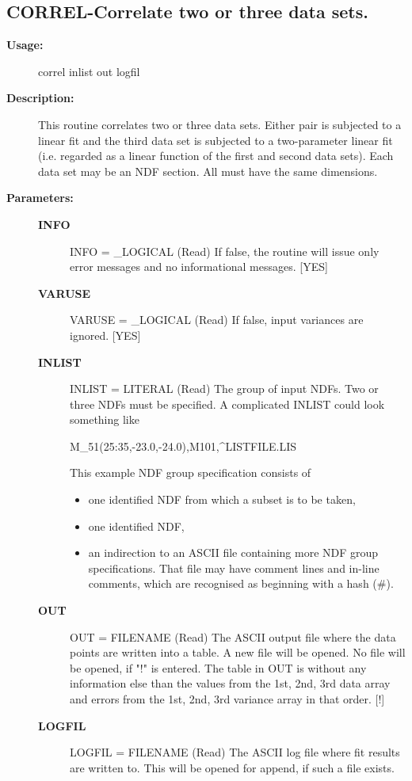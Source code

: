 \subsection{CORREL-\label{CORREL}Correlate two or three data sets.}
\begin{description}

\item [\textbf{Usage:}]

   correl inlist out logfil


\item [\textbf{Description:}]

   This routine correlates two or three data sets. Either pair is
   subjected to a linear fit and the third data set is subjected to a
   two-parameter linear fit (i.e. regarded as a linear function of
   the first and second data sets). Each data set may be an NDF
   section. All must have the same dimensions.

\item [\textbf{Parameters:}]
\begin{description}
\item [\textbf{INFO}]
INFO = \_LOGICAL (Read)
   If false, the routine will issue only error messages and no
   informational messages. [YES]
\item [\textbf{VARUSE}]
VARUSE = \_LOGICAL (Read)
   If false, input variances are ignored. [YES]
\item [\textbf{INLIST}]
INLIST = LITERAL (Read)
   The group of input NDFs. Two or three NDFs must be specified.
   A complicated INLIST could look something like
\begin{terminalv}
   M_51(25:35,-23.0,-24.0),M101,^LISTFILE.LIS
\end{terminalv}
   This example NDF group specification consists of
\begin{itemize}
   \item  one identified NDF from which a subset is to be taken,
   \item  one identified NDF,
   \item  an indirection to an ASCII file containing more NDF group
      specifications. That file may have comment lines and in-line
      comments, which are recognised as beginning with a hash (\#).
\end{itemize}
\item [\textbf{OUT}]
OUT = FILENAME (Read)
   The ASCII output file where the data points are written into a
   table. A new file will be opened. No file will be opened, if
   "!" is entered.
   The table in OUT is without any information else than the
   values from the 1st, 2nd, 3rd data array and errors from the
   1st, 2nd, 3rd variance array in that order. [!]
\item [\textbf{LOGFIL}]
LOGFIL = FILENAME (Read)
   The ASCII log file where fit results are written to. This will
   be opened for append, if such a file exists.
\end{description}

\end{description}
